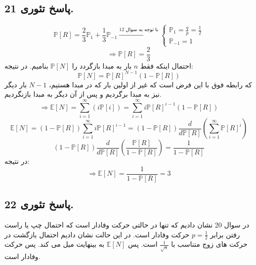 \documentclass[]{article}
\begin{document}
\subsection{پاسخ تئوری 21.}
\begin{equation}
	\nonumber
	\mathbb{P}[R] = \frac{2}{3} \mathbb{P}_1 + \frac{1}{3} \mathbb{P}_{-1} \overset{\text{با توجه به سوال 12}}{\longrightarrow}
	\begin{cases}
		\mathbb{P}_1 = \frac{q}{p} = \frac{1}{2}\\
		\mathbb{P}_{-1} = 1
	\end{cases}
\end{equation}
\begin{equation}
	\nonumber
	\Longrightarrow\mathbb{P}[R] = \frac{2}{3}
\end{equation}
احتمال اینکه فقط $n$ بار به مبدا بازگردد را 
$\mathbb{P}[N]$
بنامیم. در نتیجه:
\begin{equation}
	\nonumber
	\mathbb{P}[N] = \mathbb{P}[R]^{N - 1}(1 - \mathbb{P}[R])
\end{equation}
که رابطه فوق با این فرض است که غیر از اولین بار که در مبدا هستیم، $N - 1$ بار دیگر نیز به  مبدا برگردیم و پس از آن دیگر به مبدا بازنگردیم.
\begin{equation}
	\nonumber
	\Rightarrow \mathbb{E}[N] = \sum_{i = 1}^{\infty}(i \mathbb{P}[i]) = \sum_{i = 1}^{\infty} i\mathbb{P}[R]^{i-1}(1-\mathbb{P}[R])
\end{equation}
\begin{equation}
	\nonumber
	\mathbb{E}[N] = (1 - \mathbb{P}[R]) \sum_{i = 1}^{\infty} i\mathbb{P}[R]^{i-1} = (1-\mathbb{P}[R]) \frac{d}{d\mathbb{P}[R]} (\sum_{i = 1}^{\infty} \mathbb{P}[R]^i)
\end{equation}
\begin{equation}
	\nonumber
	(1 - \mathbb{P}[R])\frac{d}{d\mathbb{P}[R]}(\frac{\mathbb{P}[R]}{1 - \mathbb{P}[R]}) = \frac{1}{1-\mathbb{P}[R]}
\end{equation}
در نتیجه:
\begin{equation}
	\nonumber
	\Rightarrow \mathbb{E}[N] = \frac{1}{1 - \mathbb{P}[R]} = 3
\end{equation}
\newpage
\subsection{پاسخ تئوری 22.}
در سوال 20 نشان دادیم که تنها در حالتی حرکت وفادار است که احتمال چپ یا راست رفتن برابر 
$p = \frac{1}{2}$
حرکت وفادار است. در این حالت نشان دادیم احتمال بازگشت در حرکت های زوج متناسب با 
$\frac{1}{\sqrt{n}}$
است. پس 
$\mathbb{E}[N]$
به بینهایت میل می کند. پس حرکت وفادار است.
\newpage
\end{document}
